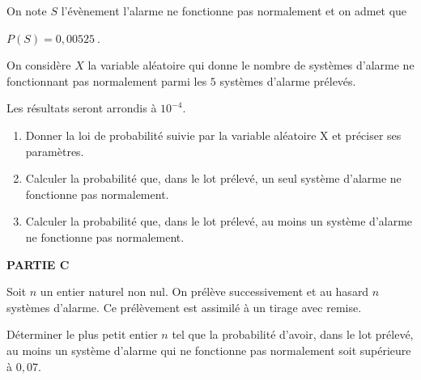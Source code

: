 \documentclass[10pt]{article}
\providecommand{\np}[2][]{{#2~#1}}
\begin{document}
On note $S$ l'évènement \og  l'alarme ne fonctionne pas normalement \fg{}  et on admet que

$P(S) = \np{0,00525}$.

On considère $X$ la variable aléatoire qui donne le nombre de systèmes d'alarme ne fonctionnant pas normalement parmi les $5$ systèmes d'alarme prélevés.

Les résultats seront arrondis à $10^{-4}$.

\medskip

\begin{enumerate}
\item Donner la loi de probabilité suivie par la variable aléatoire X et préciser ses paramètres.
\item Calculer la probabilité que, dans le lot prélevé, un seul système d'alarme ne fonctionne pas normalement.
\item Calculer la probabilité que, dans le lot prélevé, au moins un système d'alarme ne fonctionne pas normalement.
\end{enumerate}

\medskip

\textbf{PARTIE C}

\medskip

Soit $n$ un entier naturel non nul. On prélève successivement et au hasard $n$ systèmes d'alarme. Ce prélèvement est assimilé à un tirage avec remise.

Déterminer le plus petit entier $n$ tel que la probabilité d'avoir, dans le lot prélevé, au moins un système d'alarme qui ne fonctionne pas normalement soit supérieure à $0,07$.

\bigskip
\end{document}
